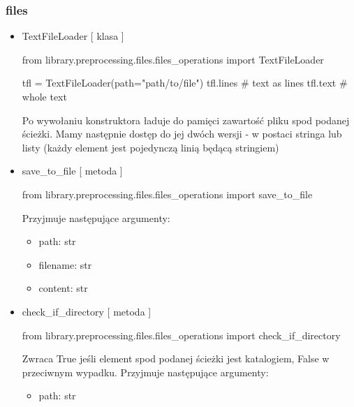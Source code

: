 \subsubsection{files}

\myspace
{}
\myspace

\begin{itemize}

\item{TextFileLoader [ klasa ] }

\begin{python}
from library.preprocessing.files.files_operations import TextFileLoader

tfl = TextFileLoader(path="path/to/file")
tfl.lines  # text as lines
tfl.text   # whole text
\end{python}

Po wywołaniu konstruktora ładuje do pamięci zawartość pliku spod podanej ścieżki. Mamy następnie 
dostęp do jej dwóch wersji - w postaci stringa lub listy (każdy element jest pojedynczą 
linią będącą stringiem)

\item{save\_to\_file [ metoda ] }
\begin{import}
from library.preprocessing.files.files_operations import save_to_file
\end{import}

Przyjmuje następujące argumenty:
\begin{itemize}
	\item path: str
	\item filename: str
	\item content: str
\end{itemize}

\item{check\_if\_directory [ metoda ] }
\begin{import}
from library.preprocessing.files.files_operations import check_if_directory
\end{import}
Zwraca True jeśli element spod podanej ścieżki jest katalogiem, False w przeciwnym wypadku.
Przyjmuje następujące argumenty:
\begin{itemize}
	\item path: str
\end{itemize}


\end{itemize}
